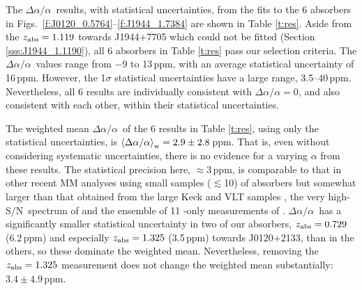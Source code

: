 \documentclass[fleqn,usenatbib,usedcolumn]{mnras}
\renewcommand{\la}{\lesssim} %
\newcommand{\Sref}[1]{Section \ref{#1}}
\newcommand{\Tref}[1]{Table \ref{#1}}
\newcommand{\SN}{\ensuremath{\textrm{S/N}}}
\newcommand{\zab}{\ensuremath{z_\textrm{\scriptsize abs}}}
\newcommand{\daa}{\ensuremath{\Delta\alpha/\alpha}}
\begin{document}
The \daa\ results, with statistical uncertainties, from the fits to the 6 absorbers in Figs.\ \ref{f:J0120_0.5764}--\ref{f:J1944_1.7384} are shown in \Tref{t:res}. Aside from the $\zab=1.119$ towards J1944$+$7705 which could not be fitted (\Sref{sss:J1944_1.1190}), all 6 absorbers in \Tref{t:res} pass our selection criteria. The \daa\ values range from $-9$ to 13\,ppm, with an average statistical uncertainty of 16\,ppm. However, the 1$\sigma$ statistical uncertainties have a large range, 3.5--40\,ppm. Nevertheless, all 6 results are individually consistent with $\daa=0$, and also consistent with each other, within their statistical uncertainties.

The weighted mean \daa\ of the 6 results in \Tref{t:res}, using only the statistical uncertainties, is $\left<\daa\right>_{\rm w}=2.9\pm2.8$\,ppm. That is, even without considering systematic uncertainties, there is no evidence for a varying $\alpha$ from these results. The statistical precision here, $\approx$3\,ppm, is comparable to that in other recent MM analyses using small samples ($\la$10) of absorbers \citep[e.g.][]{Molaro:2013:A68,Evans:2014:128} but somewhat larger than that obtained from the large Keck and VLT samples \citep[1.2\,ppm][]{Murphy:2004:131,King:2012:3370}, the very high-\SN\ spectrum of \citet{Kotus:2017:3679} and the ensemble of 11 -only measurements of \citet{Murphy:2016:2461}. \daa\ has a significantly smaller statistical uncertainty in two of our absorbers, $\zab=0.729$ (6.2\,ppm) and especially $\zab=1.325$ (3.5\,ppm) towards J0120$+$2133, than in the others, so these dominate the weighted mean. Nevertheless, removing the $\zab=1.325$ measurement does not change the weighted mean substantially: $3.4\pm4.9$\,ppm.
\end{document}
